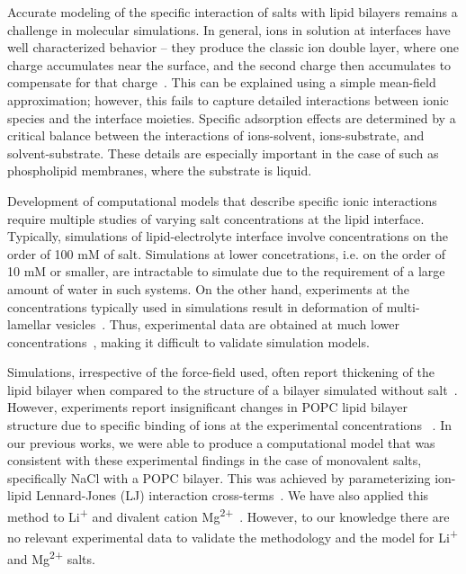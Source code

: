 \documentclass[12pt,openany,final]{book}
\newcommand{\li}{Li\textsuperscript{+}}
\newcommand{\mg}{Mg\textsuperscript{2+}}
\newcommand{\nacl}{NaCl}
\begin{document}
Accurate modeling of the specific interaction of salts with lipid bilayers remains a challenge in molecular simulations.
In general, ions in solution at interfaces have well characterized behavior -- they produce the classic ion double layer, where
one charge accumulates near the surface, and the second charge then accumulates to compensate for
that charge~\cite{israelachvili:2011:intermol}.
This can be explained using a simple mean-field approximation;
however, this fails to capture detailed interactions between ionic species and
the interface moieties. Specific adsorption effects are determined by a critical
balance between the interactions of ions-solvent, ions-substrate,
and solvent-substrate. These details are especially important in the case of
such as phospholipid membranes, where the substrate is liquid.

Development of computational models that describe specific ionic interactions
require multiple studies of varying salt concentrations at the lipid interface.
Typically, simulations of lipid-electrolyte interface involve concentrations on the order of 100 mM of salt.
Simulations at lower concetrations, i.e. on the order of 10 mM or smaller, are intractable to simulate due to the requirement
of a large amount of water in such systems.
On the other hand, experiments at the concentrations typically used in simulations result in deformation of
multi-lamellar vesicles~\cite{kurakin:2021:effect,pabst:2007:rigidification,inoko:1975,yamada:2005}.
Thus, experimental data are obtained
at much lower concentrations~\cite{kurakin:2021:effect,kucerka:2020,kurakin:2022:cations,inoko:1975,yamada:2005}, making
it difficult to validate simulation models.

Simulations, irrespective of the force-field used, often report thickening of the lipid
bilayer when compared to the structure of a bilayer simulated without salt~\cite{Cordomi:2008,Cordomi:2009,venable:2013,yoo:2012:improved}.
However, experiments report insignificant changes in POPC lipid
bilayer structure due to specific binding of ions at the experimental concentrations
~\cite{kurakin:2021:effect,kucerka:2020,kurakin:2022:cations}.
In our previous works, we were able to produce a computational model that was consistent with these experimental findings
in the case of monovalent salts, specifically \nacl{} with a POPC bilayer.
This was achieved by parameterizing ion-lipid Lennard-Jones (LJ) interaction cross-terms~\cite{saunders:2022}.
We have also applied this method to \li{} and divalent cation \mg{}~\cite{saunders:2024}. However, to our knowledge there
are no relevant experimental data to validate the methodology and the model for \li{} and \mg{} salts.
\end{document}
